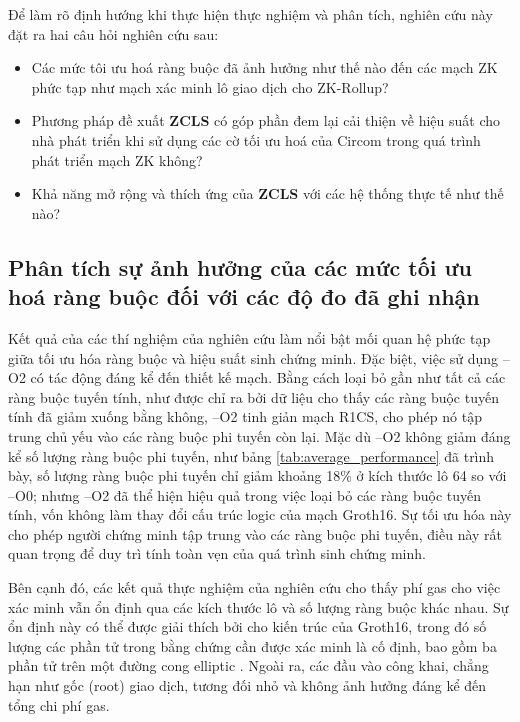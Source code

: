     Để làm rõ định hướng khi thực hiện thực nghiệm và phân tích, nghiên cứu này đặt ra hai câu hỏi nghiên cứu sau:
    \begin{itemize}
        \item Các mức tôi ưu hoá ràng buộc đã ảnh hưởng như thế nào đến các mạch ZK phức tạp như mạch xác minh lô giao dịch cho ZK-Rollup?
        \item Phương pháp đề xuất \textbf{ZCLS} có góp phần đem lại cải thiện về hiệu suất cho nhà phát triển khi sử dụng các cờ tối ưu hoá của Circom trong quá trình phát triển mạch ZK không? 
        
        \item Khả năng mở rộng và thích ứng của \textbf{ZCLS} với các hệ thống thực tế như thế nào?
    \end{itemize}
    
    \subsection{Phân tích sự ảnh hưởng của các mức tối ưu hoá ràng buộc đối với các độ đo đã ghi nhận}

    Kết quả của các thí nghiệm của nghiên cứu làm nổi bật mối quan hệ phức tạp giữa tối ưu hóa ràng buộc và hiệu suất sinh chứng minh. Đặc biệt, việc sử dụng --O2 có tác động đáng kể đến thiết kế mạch. Bằng cách loại bỏ gần như tất cả các ràng buộc tuyến tính, như được chỉ ra bởi dữ liệu cho thấy các ràng buộc tuyến tính đã giảm xuống bằng không, --O2 tinh giản mạch R1CS, cho phép nó tập trung chủ yếu vào các ràng buộc phi tuyến còn lại. Mặc dù --O2 không giảm đáng kể số lượng ràng buộc phi tuyến, như bảng \ref{tab:average_performance} đã trình bày, số lượng ràng buộc phi tuyến chỉ giảm khoảng 18\% ở kích thước lô 64 so với --O0; nhưng --O2 đã thể hiện hiệu quả trong việc loại bỏ các ràng buộc tuyến tính, vốn không làm thay đổi cấu trúc logic của mạch Groth16. Sự tối ưu hóa này cho phép người chứng minh tập trung vào các ràng buộc phi tuyến, điều này rất quan trọng để duy trì tính toàn vẹn của quá trình sinh chứng minh.

    Bên cạnh đó, các kết quả thực nghiệm của nghiên cứu cho thấy phí gas cho việc xác minh vẫn ổn định qua các kích thước lô và số lượng ràng buộc khác nhau. Sự ổn định này có thể được giải thích bởi cho kiến trúc của Groth16, trong đó số lượng các phần tử trong bằng chứng cần được xác minh là cố định, bao gồm ba phần tử trên một đường cong elliptic \cite{groth2016size}. Ngoài ra, các đầu vào công khai, chẳng hạn như gốc (root) giao dịch, tương đối nhỏ và không ảnh hưởng đáng kể đến tổng chi phí gas.

